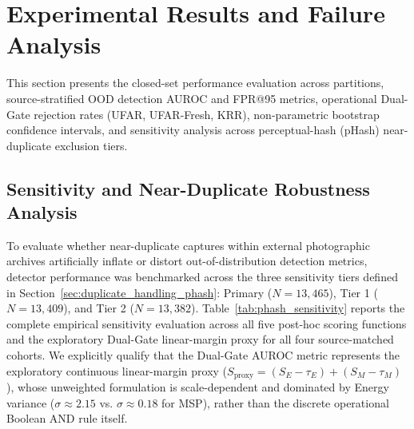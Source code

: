 \section{Experimental Results and Failure Analysis}
\label{sec:results}

This section presents the closed-set performance evaluation across partitions, source-stratified OOD detection AUROC and FPR@95 metrics, operational Dual-Gate rejection rates (UFAR, UFAR-Fresh, KRR), non-parametric bootstrap confidence intervals, and sensitivity analysis across perceptual-hash (pHash) near-duplicate exclusion tiers.

\subsection{Sensitivity and Near-Duplicate Robustness Analysis}
\label{sec:results_sensitivity}

To evaluate whether near-duplicate captures within external photographic archives artificially inflate or distort out-of-distribution detection metrics, detector performance was benchmarked across the three sensitivity tiers defined in Section~\ref{sec:duplicate_handling_phash}: Primary ($N = 13,465$), Tier 1 ($N = 13,409$), and Tier 2 ($N = 13,382$). Table~\ref{tab:phash_sensitivity} reports the complete empirical sensitivity evaluation across all five post-hoc scoring functions and the exploratory Dual-Gate linear-margin proxy for all four source-matched cohorts. We explicitly qualify that the Dual-Gate AUROC metric represents the exploratory continuous linear-margin proxy ($S_{\text{proxy}} = (S_E - \tau_E) + (S_M - \tau_M)$), whose unweighted formulation is scale-dependent and dominated by Energy variance ($\sigma \approx 2.15$ vs. $\sigma \approx 0.18$ for MSP), rather than the discrete operational Boolean AND rule itself.

